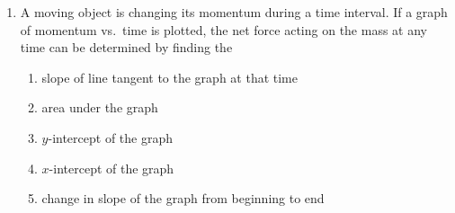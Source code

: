 \documentclass{../../../oss-classkick}
\begin{document}
\begin{multicols}{2}
\begin{enumerate}[resume,leftmargin=18pt]
    \columnbreak
    
  \item A moving object is changing its momentum during a time interval. If a
    graph of momentum vs.\ time is plotted, the net force acting on the mass
    at any time can be determined by finding the
    \begin{enumerate}[nosep,leftmargin=18pt,label=(\Alph*)]
    \item slope of line tangent to the graph at that time
    \item area under the graph
    \item $y$-intercept of the graph
    \item $x$-intercept of the graph
    \item change in slope of the graph from beginning to end
    \end{enumerate}
    \vspace{.7in}
    

\end{enumerate}
\end{multicols}
\end{document}
